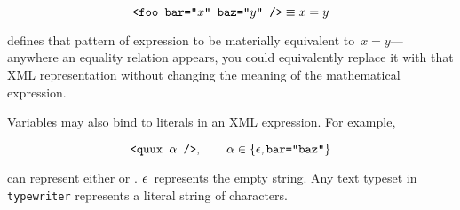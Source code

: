 \begin{equation*}
  \texttt{<foo bar="$x$" baz="$y$" />} \equiv x = y
\end{equation*}

\noindent
defines that pattern of  expression to be materially
  equivalent to~$x=y$---%
    anywhere an equality relation appears,
      you could equivalently replace it with that XML representation without
        changing the meaning of the mathematical expression.

Variables may also bind to literals in an XML expression.
For example,

\begin{equation*}
  \texttt{<quux $\alpha$ />},\qquad\alpha\in\left\{\epsilon, \texttt{bar="baz"}\right\}
\end{equation*}

\noindent
can represent either  or .
$\epsilon$~represents the empty string.
Any text typeset in \texttt{typewriter} represents a literal
  string of characters.
